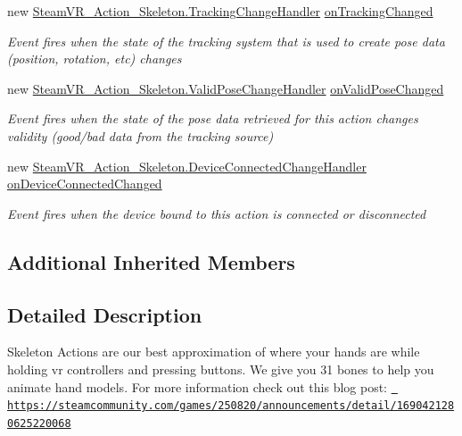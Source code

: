 \begin{DoxyCompactItemize}
new \mbox{\hyperlink{class_valve_1_1_v_r_1_1_steam_v_r___action___skeleton_a460bcda41aa359ec14435212bed2b856}{Steam\+V\+R\+\_\+\+Action\+\_\+\+Skeleton.\+Tracking\+Change\+Handler}} \mbox{\hyperlink{class_valve_1_1_v_r_1_1_steam_v_r___action___skeleton___source_a618a821a496c455217e722b5e4a5541c}{on\+Tracking\+Changed}}
\begin{DoxyCompactList}\small\item\em Event fires when the state of the tracking system that is used to create pose data (position, rotation, etc) changes \end{DoxyCompactList}\item 
new \mbox{\hyperlink{class_valve_1_1_v_r_1_1_steam_v_r___action___skeleton_af5ad5e815b7f555aa33ee8b74385e89e}{Steam\+V\+R\+\_\+\+Action\+\_\+\+Skeleton.\+Valid\+Pose\+Change\+Handler}} \mbox{\hyperlink{class_valve_1_1_v_r_1_1_steam_v_r___action___skeleton___source_a6fe9e466864ed83e2bb05bd40a1fc8b0}{on\+Valid\+Pose\+Changed}}
\begin{DoxyCompactList}\small\item\em Event fires when the state of the pose data retrieved for this action changes validity (good/bad data from the tracking source) \end{DoxyCompactList}\item 
new \mbox{\hyperlink{class_valve_1_1_v_r_1_1_steam_v_r___action___skeleton_a737d68e8f67790bf838b4f5bac3ffae1}{Steam\+V\+R\+\_\+\+Action\+\_\+\+Skeleton.\+Device\+Connected\+Change\+Handler}} \mbox{\hyperlink{class_valve_1_1_v_r_1_1_steam_v_r___action___skeleton___source_ac4627b06b07b39de764adbae3b05052d}{on\+Device\+Connected\+Changed}}
\begin{DoxyCompactList}\small\item\em Event fires when the device bound to this action is connected or disconnected \end{DoxyCompactList}\end{DoxyCompactItemize}
\subsection*{Additional Inherited Members}


\subsection{Detailed Description}
Skeleton Actions are our best approximation of where your hands are while holding vr controllers and pressing buttons. We give you 31 bones to help you animate hand models. For more information check out this blog post\+: \href{https://steamcommunity.com/games/250820/announcements/detail/1690421280625220068}{\texttt{ https\+://steamcommunity.\+com/games/250820/announcements/detail/1690421280625220068}} 



